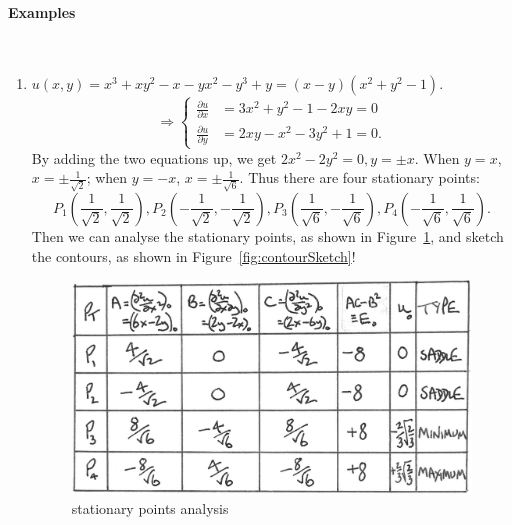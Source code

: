 \documentclass[12pt]{report}
\theoremstyle{definition}
\begin{document}
\paragraph{Examples}
\,

\begin{enumerate}[label = (\roman*)]
    \item $u(x,y) = x^{3} + xy^{2} - x - yx^{2} - y^{3} + y = (x-y)(x^{2}+y^{2}-1)$.
        \[
            \Rightarrow{}\left\{\begin{align*}
                    \frac{\partial u}{\partial x} & = 3x^{2} + y^{2} - 1 - 2xy = 0 \\
                    \frac{\partial u}{\partial y} & = 2xy - x^{2} - 3y^{2} + 1 = 0.
            \end{align*}\right.
        \]By adding the two equations up, we get $2x^{2}-2y^{2}=0, y = \pm x$.
        When $y = x$, $x = \pm \frac{1}{\sqrt{2}}$; when $y = -x$, $x = \pm \frac{1}{\sqrt{6}}$.
        Thus there are four stationary points:\[
            P_1\left(\frac{1}{\sqrt{2}}, \frac{1}{\sqrt{2}}\right),
            P_2\left(-\frac{1}{\sqrt{2}}, -\frac{1}{\sqrt{2}}\right),
            P_3\left(\frac{1}{\sqrt{6}}, -\frac{1}{\sqrt{6}}\right),
            P_4\left(-\frac{1}{\sqrt{6}}, \frac{1}{\sqrt{6}}\right).
        \]
        Then we can analyse the stationary points,
        as shown in Figure~\ref{fig:stationaryPointsAnalysis},
        and sketch the contours, as shown in Figure~\ref{fig:contourSketch}!

\begin{figure}
  	\includegraphics[scale=0.15]{stationaryPointsAnalysis.jpg}
  	\centering
    \caption{stationary points analysis}\label{fig:stationaryPointsAnalysis}
\end{figure}


\end{enumerate}
\end{document}
